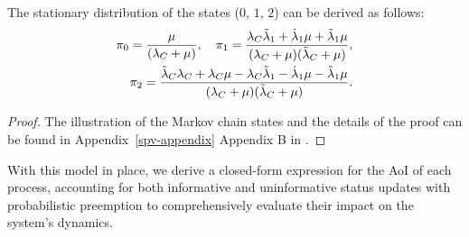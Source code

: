 \begin{Lemma}\label{Lem1}
The stationary distribution of the states (\(0\), \(1\), \(2\)) can be derived as follows:
\begin{align}
\pi_0 = \frac{\mu}{(\lambda_C + \mu)}, \quad
\pi_1 = \frac{\lambda_C\Tilde{\lambda}_{1} + \dot{\lambda}_{1}\mu + \Tilde{\lambda}_{1}\mu}{(\lambda_C + \mu)(\Tilde{\lambda}_{C} + \mu)}, \\
\pi_2 = \frac{\Tilde{\lambda}_{C}\lambda_C + \lambda_C\mu -\lambda_C\Tilde{\lambda}_{1}  - \dot{\lambda}_{1}\mu - \Tilde{\lambda}_{1}\mu}{(\lambda_C + \mu)(\Tilde{\lambda}_{C} + \mu)}. 
\label{pi-distributions}
\end{align}
\begin{proof}
The illustration of the Markov chain states and the details of the proof can be found in 
{Appendix~\ref{spv-appendix}}
{Appendix B in \cite{technicalNote}}. %
\end{proof}
\end{Lemma}
With this model in place, we derive a closed-form expression for the AoI of each process, accounting for both informative and uninformative status updates with probabilistic preemption to comprehensively evaluate their impact on the system's dynamics. %

